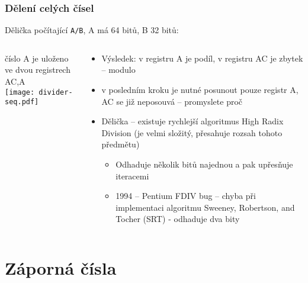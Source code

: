 \documentclass{beamer}
\begin{document}
\begin{frame}
\frametitle{Dělení celých čísel}

Dělička počítající \texttt{A/B}, A má 64 bitů, B 32 bitů:\\
\begin{columns}
\begin{column}{0.4\textwidth}
číslo A je uloženo ve dvou registrech AC,A\\
\texttt{[image: divider-seq.pdf]}
\end{column}
\hfill
\begin{column}{0.6\textwidth}
\begin{itemize}
\item Výsledek: v registru A je podíl, v registru AC je zbytek -- modulo
\item v posledním kroku je nutné posunout pouze registr A, AC se již neposouvá -- promyslete proč
\item Dělička -- existuje rychlejší algoritmus High Radix Division (je velmi složitý, přesahuje rozsah tohoto předmětu)
\begin{itemize}
\item Odhaduje několik bitů najednou a pak upřesňuje iteracemi
\item 1994 -- Pentium FDIV bug -- chyba při implementaci algoritmu Sweeney, Robertson, and Tocher (SRT) - odhaduje dva bity
\end{itemize}
\end{itemize}
\end{column}
\end{columns}


\end{frame}


\section{Záporná čísla}
\end{document}
